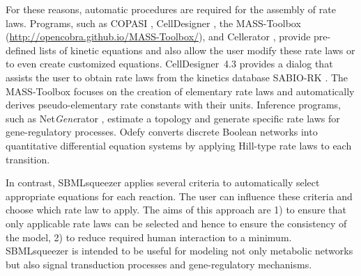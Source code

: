 \documentclass{bioinfo}
\begin{document}
For these reasons, %
automatic procedures are required for the assembly of rate laws.
Programs, such as COPASI \citep{Hoops2006}, CellDesigner \citep{Funahashi2003}, the MASS-Toolbox (\url{http://opencobra.github.io/MASS-Toolbox/}), and Cellerator \citep{Shapiro2002}, provide pre-defined lists of kinetic equations and also allow the user modify these rate laws or to even create customized equations.
CellDesigner~4.3 %
provides a dialog that assists the user to obtain rate laws from the kinetics database SABIO-RK \citep{Wittig2012}.
The MASS-Toolbox focuses on the creation of elementary rate laws and automatically derives pseudo-elementary rate constants with their units.
Inference programs, such as Net\emph{Gene}rator \citep{Weber2013}, estimate a topology and generate specific rate laws  for gene-regulatory processes. 
Odefy \citep{Krumsiek2010} converts discrete Boolean networks into quantitative differential equation systems by applying Hill-type rate laws to each transition. %

In contrast, SBMLsqueezer applies several criteria to automatically select appropriate equations for each reaction.
The user can influence these criteria %
and choose which rate law to apply.
The aims of this approach are 1) to ensure that only applicable rate laws can be selected and hence to ensure the consistency of the model, 2) to reduce required human interaction to a minimum.
SBMLsqueezer is intended to be useful for modeling not only metabolic networks but also signal transduction processes and gene-regulatory mechanisms.
\end{document}
